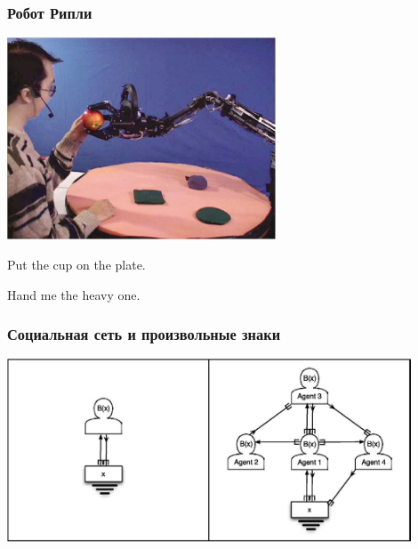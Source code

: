 \documentclass[default]{beamer}
\begin{document}
	\begin{frame}
		\frametitle{Робот Рипли}
		
		\begin{center}
			\includegraphics[width=0.6\textwidth]{roy_robot}
		\end{center}
		
		Put the cup on the plate.
		
		Hand me the heavy one.
	\end{frame}

	\begin{frame}
		\frametitle{Социальная сеть и произвольные знаки}
		
		\begin{center}
			\includegraphics[width=0.9\textwidth]{roy_group}
		\end{center}
	\end{frame}
					
	
\end{document}
